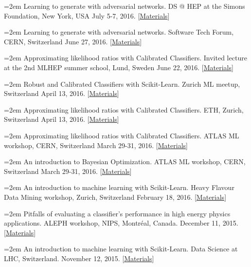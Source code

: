 \documentclass{scrartcl}
\newcommand{\MarginText}[1]{\marginpar{\raggedleft\itshape\small#1}}
\newcommand{\NewPublication}[4]{\noindent\hangindent=2em\hangafter=0 \MarginText{\color{black} #1}{\footnotesize [{\color{Maroon}#2}]} #3 {\footnotesize\color{gray}#4}\vspace{0.5em}}
\begin{document}
\begin{cv}{}
\NewPublication{}{28}{Learning to generate with adversarial networks.}{%
DS @ HEP at the Simons Foundation, New York, USA
July 5-7, 2016.
[\href{https://indico.hep.caltech.edu/indico/conferenceTimeTable.py?confId=102}{Materials}]}

\NewPublication{}{27}{Learning to generate with adversarial networks.}{%
Software Tech Forum, CERN, Switzerland
June 27, 2016.
[\href{https://indico.cern.ch/event/544644/contributions/2210328/attachments/1299201/1938586/slides.pdf}{Materials}]}

\NewPublication{}{26}{Approximating likelihood ratios with Calibrated Classifiers.}{%
Invited lecture at the 2nd MLHEP summer school, Lund, Sweden
June 22, 2016.
[\href{https://github.com/glouppe/talk-approximating-likelihood-ratios-with-classifiers}{Materials}]}

\NewPublication{}{25}{Robust and Calibrated Classifiers with Scikit-Learn.}{%
Zurich ML meetup, Switzerland
April 13, 2016.
[\href{https://github.com/glouppe/tutorials-scikit-learn}{Materials}]}

\NewPublication{}{24}{Approximating likelihood ratios with Calibrated Classifiers.}{%
ETH, Zurich, Switzerland
April 13, 2016.
[\href{https://github.com/glouppe/talk-approximating-likelihood-ratios-with-classifiers}{Materials}]}

\NewPublication{}{23}{Approximating likelihood ratios with Calibrated Classifiers.}{%
ATLAS ML workshop, CERN, Switzerland
March 29-31, 2016.
[\href{https://github.com/glouppe/talk-approximating-likelihood-ratios-with-classifiers}{Materials}]}

\NewPublication{}{22}{An introduction to Bayesian Optimization.}{%
ATLAS ML workshop, CERN, Switzerland
March 29-31, 2016.
[\href{https://github.com/glouppe/talk-bayesian-optimisation}{Materials}]}

\NewPublication{}{21}{An introduction to machine learning with Scikit-Learn.}{%
Heavy Flavour Data Mining workshop, Zurich, Switzerland
February 18, 2016.
[\href{https://github.com/glouppe/tutorial-scikit-learn}{Materials}]}

\NewPublication{2015}{20}{Pitfalls of evaluating a classifier’s performance in high energy physics applications.}{%
ALEPH workshop, NIPS, Montréal, Canada.
December 11, 2015.
[\href{https://github.com/glouppe/talk-aleph-workshop2015}{Materials}]}

\NewPublication{}{19}{An introduction to machine learning with Scikit-Learn.}{%
Data Science at LHC, Switzerland.
November 12, 2015.
[\href{https://github.com/glouppe/tutorial-sklearn-dslhc2015}{Materials}]}


\end{cv}
\end{document}
